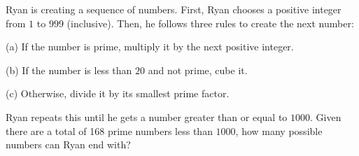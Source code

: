 Ryan is creating a sequence of numbers. First, Ryan chooses a positive integer from $1$ to $999$ (inclusive). Then, he follows three rules to create the next number:

(a) If the number is prime, multiply it by the next positive integer.

(b) If the number is less than $20$ and not prime, cube it.

(c) Otherwise, divide it by its smallest prime factor.

Ryan repeats this until he gets a number greater than or equal to $1000$. Given there are a total of 168 prime numbers less than $1000$, how many possible numbers can Ryan end with?
